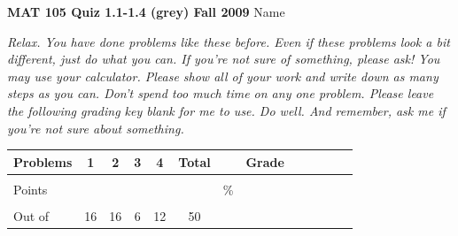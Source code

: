 \documentclass[12pt]{article}
\begin{document}
{\bf MAT 105 Quiz 1.1-1.4 (grey) Fall 2009} \hspace{.4in} {\large Name} \hrulefill

\hrulefill

 \emph{Relax.  You have done problems like these before.  Even if these problems look a bit different, just do what you can.  If you're not sure of something, please ask! You may use your calculator.  Please show all of your work and write down as many steps as you can.  Don't spend too much time on any one problem.  Please leave the following grading key blank for me to use.  Do well.  And remember, ask me if you're not sure about something.}

\begin{center}

\begin{tabular}
{|l|c|c|c|c|c|c|c|c|c|c|c|c|} \hline

 Problems & \hspace{5 pt} 1 \hspace{5 pt}  & \hspace{5 pt} 2 \hspace{5 pt} & \hspace{5 pt} 3 \hspace{5 pt} & \hspace{5 pt} 4 \hspace{5 pt} &  \hspace{5 pt} Total  \hspace{5 pt} & &  \hspace{5 pt} Grade \hspace{5 pt}  \\ \hline
&&&&& &&\\  
Points &&&&& &    \hspace{.8in}\% &  \\ 
&&&&& && \\  \hline
Out of & 16 & 16 & 6 & 12 &50 & & \\ \hline

\end {tabular}

\end{center}

\hrulefill
\end{document}

